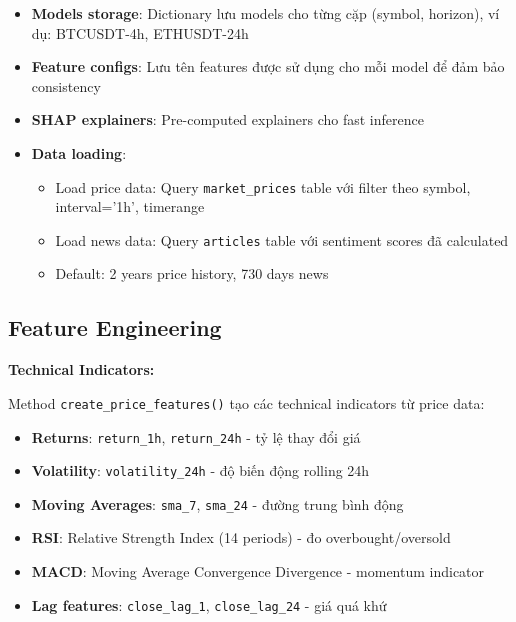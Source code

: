 \begin{itemize}
    \item \textbf{Models storage}: Dictionary lưu models cho từng cặp (symbol, horizon), ví dụ: BTCUSDT-4h, ETHUSDT-24h
    
    \item \textbf{Feature configs}: Lưu tên features được sử dụng cho mỗi model để đảm bảo consistency
    
    \item \textbf{SHAP explainers}: Pre-computed explainers cho fast inference
    
    \item \textbf{Data loading}:
    \begin{itemize}
        \item Load price data: Query \texttt{market\_prices} table với filter theo symbol, interval='1h', timerange
        \item Load news data: Query \texttt{articles} table với sentiment scores đã calculated
        \item Default: 2 years price history, 730 days news
    \end{itemize}
\end{itemize}

\subsection{Feature Engineering}

\noindent\textbf{Technical Indicators:}

Method \texttt{create\_price\_features()} tạo các technical indicators từ price data:

\begin{itemize}
    \item \textbf{Returns}: \texttt{return\_1h}, \texttt{return\_24h} - tỷ lệ thay đổi giá
    \item \textbf{Volatility}: \texttt{volatility\_24h} - độ biến động rolling 24h
    \item \textbf{Moving Averages}: \texttt{sma\_7}, \texttt{sma\_24} - đường trung bình động
    \item \textbf{RSI}: Relative Strength Index (14 periods) - đo overbought/oversold
    \item \textbf{MACD}: Moving Average Convergence Divergence - momentum indicator
    \item \textbf{Lag features}: \texttt{close\_lag\_1}, \texttt{close\_lag\_24} - giá quá khứ
\end{itemize}

